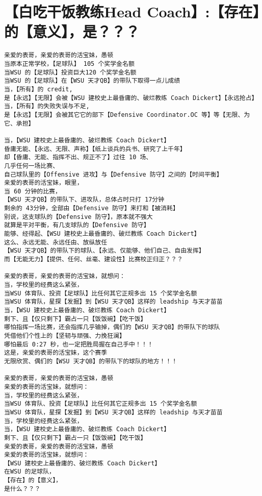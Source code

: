 \documentclass[9pt, b5paper]{article}
\begin{document}
\section{【白吃干饭教练Head Coach】:【存在】的【意义】，是？？？}
\label{sec-13}
\begin{verbatim}
亲爱的表哥，亲爱的表哥的活宝妹，愚顿
当原本正常学校，【足球队】 105 个奖学金名额
当WSU 的【足球队】投资巨大120 个奖学金名额
当WSU 的【足球队】在【WSU 天才QB】的带队下取得一点儿成绩
当，【所有】的 credit,
是【永远】【无限】会被【WSU 建校史上最昏庸的、破烂教练 Coach Dickert】【永远抢占】
当，【所有】的失败失误与不足,
是【永远】【无限】会被其它它的部下【Defensive Coordinator.OC 等】等【无限、为它、承担】

当，【WSU 建校史上最昏庸的、破烂教练 Coach Dickert】
昏庸无能、【永远、无限、声称】【纸上谈兵的兵书、研究了上千年】
却【昏庸、无能、指挥不出、规正不了】过往 10 场、
几乎任何一场比赛、
自己球队里的【Offensive 进攻】与【Defensive 防守】之间的【时间平衡】
亲爱的表哥的活宝妹，眼里，
当 60 分钟的比赛，
【WSU 天才QB】的带队下、进攻队，总体占时只打 17分钟
剩余的 43分钟，全部由【Defensive 防守】来打和【被消耗】
别说，这支球队的【Defensive 防守】，原本就不强大
就算是平对平衡，有几支球队的【Defensive 防守】
能够、经得起、【WSU 建校史上最昏庸的、破烂教练 Coach Dickert】
这么、永远无能、永远任由、放纵放任
【WSU 天才QB】的带队下的球队、【永远、仅能够、他们自己、自由发挥】
而【无能无力】【提供、任何、丝毫、建设性】比赛校正归正？？？

亲爱的表哥，亲爱的表哥的活宝妹，就想问：
当，学校里的经费这么紧张，
当WSU 体育队、投资【足球队】比任何其它正规多出 15 个奖学金名额
当WSU 体育队，星探【发掘】到【WSU 天才QB】这样的 leadship 与天才苗苗
当，【WSU 建校史上最昏庸的、破烂教练 Coach Dickert】
剩下、且【仅只剩下】霸占一只【饭饭碗】【吃干饭】
哪怕指挥一场比赛，还会指挥几乎输掉，偶们的【WSU 天才QB】的带队下的球队
凭借他们个性上的【坚韧与顽强、力挽狂澜】
哪怕最后 0:27 秒，也一定把胜局握在自己手中！！！
这是，亲爱的表哥的活宝妹，这个赛季
无限欣赏、偶们的【WSU 天才QB】的带队下的球队的地方！！！

亲爱的表哥，亲爱的表哥的活宝妹，愚顿
亲爱的表哥的活宝妹，就想问：
当，学校里的经费这么紧张，
当WSU 体育队、投资【足球队】比任何其它正规多出 15 个奖学金名额
当WSU 体育队，星探【发掘】到【WSU 天才QB】这样的 leadship 与天才苗苗
当，学校里的经费这么紧张，
当，【WSU 建校史上最昏庸的、破烂教练 Coach Dickert】
剩下、且【仅只剩下】霸占一只【饭饭碗】【吃干饭】
亲爱的表哥，亲爱的表哥的活宝妹，愚顿
亲爱的表哥的活宝妹，就想问：
【WSU 建校史上最昏庸的、破烂教练 Coach Dickert】
在WSU 的足球队，
【存在】的【意义】，
是什么？？？


\end{verbatim}
\end{document}

